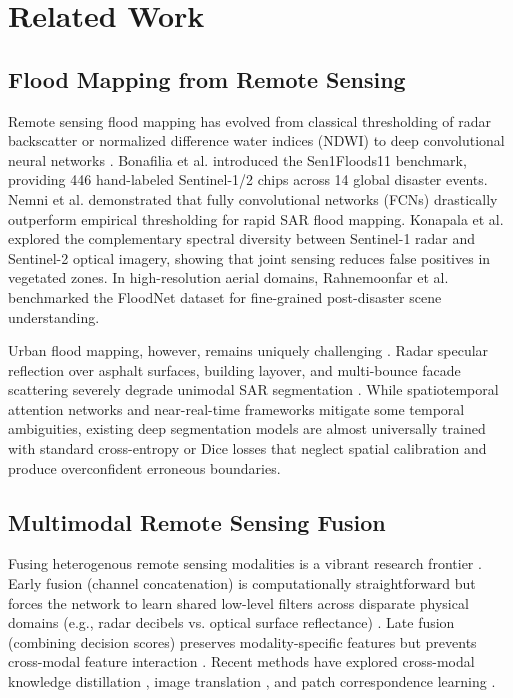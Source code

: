 \documentclass[journal]{IEEEtran}
\begin{document}
\section{Related Work}
\label{sec:related}

\subsection{Flood Mapping from Remote Sensing}
Remote sensing flood mapping has evolved from classical thresholding of radar backscatter or normalized difference water indices (NDWI) to deep convolutional neural networks \cite{bentivoglio2022, katiyar2021}. Bonafilia et al. \cite{bonafilia2020sen1floods11} introduced the Sen1Floods11 benchmark, providing 446 hand-labeled Sentinel-1/2 chips across 14 global disaster events. Nemni et al. \cite{nemni2020} demonstrated that fully convolutional networks (FCNs) drastically outperform empirical thresholding for rapid SAR flood mapping. Konapala et al. \cite{konapala2021} explored the complementary spectral diversity between Sentinel-1 radar and Sentinel-2 optical imagery, showing that joint sensing reduces false positives in vegetated zones. In high-resolution aerial domains, Rahnemoonfar et al. \cite{rahnemoonfar2021} benchmarked the FloodNet dataset for fine-grained post-disaster scene understanding.

Urban flood mapping, however, remains uniquely challenging \cite{peng2019, li2019flood}. Radar specular reflection over asphalt surfaces, building layover, and multi-bounce facade scattering severely degrade unimodal SAR segmentation \cite{zhao2021, bai2021}. While spatiotemporal attention networks \cite{zhao2021} and near-real-time frameworks \cite{shen2019, zha2023, huang2022, munawar2021} mitigate some temporal ambiguities, existing deep segmentation models are almost universally trained with standard cross-entropy or Dice losses that neglect spatial calibration and produce overconfident erroneous boundaries.

\subsection{Multimodal Remote Sensing Fusion}
Fusing heterogenous remote sensing modalities is a vibrant research frontier \cite{hong2021, schmitt2019, ienco2019}. Early fusion (channel concatenation) is computationally straightforward but forces the network to learn shared low-level filters across disparate physical domains (e.g., radar decibels vs. optical surface reflectance) \cite{mateogarcia2021}. Late fusion (combining decision scores) preserves modality-specific features but prevents cross-modal feature interaction \cite{wu2021, interdonato2019}. Recent methods have explored cross-modal knowledge distillation \cite{wang2022}, image translation \cite{zhang2020}, and patch correspondence learning \cite{hughes2020, saha2021, paoletti2019}.
\end{document}
